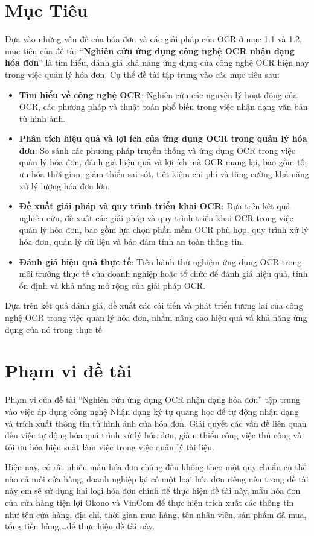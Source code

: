 \section{Mục Tiêu}
Dựa vào những vấn đề của hóa đơn và các giải pháp của OCR ở mục 1.1 và 1.2, mục tiêu của đề tài “\textbf{Nghiên cứu ứng dụng công nghệ OCR nhận dạng hóa đơn}” là tìm hiểu, đánh giá khả năng ứng dụng của công nghệ OCR hiện nay trong việc quản lý hóa đơn. Cụ thể đề tài tập trung vào các mục tiêu sau:
\begin{itemize}
    \item \textbf{Tìm hiểu về công nghệ OCR}: Nghiên cứu các nguyên lý hoạt động của OCR, các phương pháp và thuật toán phổ biến trong việc nhận dạng văn bản từ hình ảnh.
    \item \textbf{Phân tích hiệu quả và lợi ích của ứng dụng OCR trong quản lý hóa đơn}: So sánh các phương pháp truyền thống và ứng dụng OCR trong việc quản lý hóa đơn, đánh giá hiệu quả và lợi ích mà OCR mang lại, bao gồm tối ưu hóa thời gian, giảm thiểu sai sót, tiết kiệm chi phí và tăng cường khả năng xử lý lượng hóa đơn lớn.
    \item \textbf{Đề xuất giải pháp và quy trình triển khai OCR}: Dựa trên kết quả nghiên cứu, đề xuất các giải pháp và quy trình triển khai OCR trong việc quản lý hóa đơn, bao gồm lựa chọn phần mềm OCR phù hợp, quy trình xử lý hóa đơn, quản lý dữ liệu và bảo đảm tính an toàn thông tin.
    \item \textbf{Đánh giá hiệu quả thực tế}: Tiến hành thử nghiệm ứng dụng OCR trong môi trường thực tế của doanh nghiệp hoặc tổ chức để đánh giá hiệu quả, tính ổn định và khả năng mở rộng của giải pháp OCR.
\end{itemize}
Dựa trên kết quả đánh giá, đề xuất các cải tiến và phát triển tương lai của công nghệ OCR trong việc quản lý hóa đơn, nhằm nâng cao hiệu quả và khả năng ứng dụng của nó trong thực tế

\section{Phạm vi đề tài}
Phạm vi của đề tài ``Nghiên cứu ứng dụng OCR nhận dạng hóa đơn'' tập trung vào việc áp dụng công nghệ Nhận dạng ký tự quang học để tự động nhận dạng và trích xuất thông tin từ hình ảnh của hóa đơn. Giải quyết các vấn đề liên quan đến việc tự động hóa quá trình xử lý hóa đơn, giảm thiểu công việc thủ công và tối ưu hóa hiệu suất làm việc trong việc quản lý tài liệu.

Hiện nay, có rất nhiều mẫu hóa đơn chúng đều không theo một quy chuẩn cụ thể nào cả mỗi cửa hàng, doanh nghiệp lại có một loại hóa đơn riêng nên trong đề tài này em sẽ sử dụng hai loại hóa đơn chính để thực hiện đề tài này, mẫu hóa đơn của cửa hàng tiện lợi Okono và VinCom để thực hiện trích xuất các thông tin như tên cửa hàng, địa chỉ, thời gian mua hàng, tên nhân viên, sản phẩm đã mua, tổng tiền hàng,\ldots để thực hiện đề tài này.

